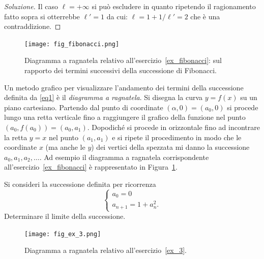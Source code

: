 \begin{proof}[Soluzione]
    Il caso $\ell=+\infty$ si può escludere in quanto ripetendo il
    ragionamento fatto sopra si otterrebbe $\ell' = 1$ da cui:
    $\ell = 1 + 1/\ell' = 2$ che è una contraddizione.
\end{proof}

\begin{figure}
  \begin{center}
    \texttt{[image: fig\_fibonacci.png]}
  \end{center}
  \caption{Diagramma a ragnatela relativo
    all'esercizio~\ref{ex_fibonacci}:
    sul rapporto dei termini successivi della successione di Fibonacci.}
  \label{fig_fibonacci}
\end{figure}

Un metodo grafico per visualizzare l'andamento dei termini della
successione definita da \eqref{eq1} è il \emph{diagramma a
  ragnatela}. Si disegna la curva $y=f(x)$ su un piano
cartesiano. Partendo dal punto di coordinate $(\alpha, 0)=(a_0, 0)$ si procede
lungo una retta verticale fino a raggiungere il grafico della funzione
nel punto $(a_0, f(a_0)) = (a_0, a_1)$.
Dopodiché si procede in
orizzontale fino ad incontrare la retta $y=x$ nel punto $(a_1,a_1)$ e
si ripete il procedimento in modo che le coordinate $x$ (ma anche le $y$)
dei vertici della spezzata mi danno la successione $a_0, a_1, a_2,
\dots$. Ad esempio il diagramma a ragnatela corrispondente
all'esercizio~\ref{ex_fibonacci} è rappresentato in
Figura~\ref{fig_fibonacci}.

\begin{exercise}\label{ex_3}
  Si consideri la successione definita per ricorrenza
  \[
  \begin{cases}
    a_0 = 0\\
    a_{n+1} = 1 + a_n^2.
  \end{cases}
  \]
  Determinare il limite della successione.
\end{exercise}

\begin{figure}
  \begin{center}
    \texttt{[image: fig\_ex\_3.png]}
  \end{center}
  \caption{Diagramma a ragnatela relativo
    all'esercizio~\ref{ex_3}.}
  \label{fig_ex_3}
\end{figure}


